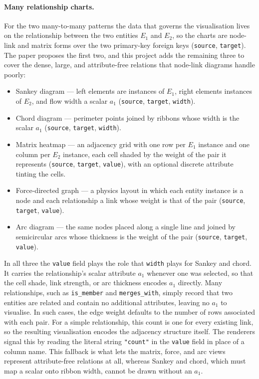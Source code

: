 \paragraph{Many relationship charts.} For the two many-to-many patterns the data that governs the visualisation lives on the relationship between the two entities $E_1$ and $E_2$, so the charts are node-link and matrix forms over the two primary-key foreign keys (\texttt{source}, \texttt{target}). The paper proposes the first two, and this project adds the remaining three to cover the dense, large, and attribute-free relations that node-link diagrams handle poorly:
\begin{itemize}
  \item Sankey diagram --- left elements are instances of $E_1$, right elements instances of $E_2$, and flow width a scalar $a_1$ (\texttt{source}, \texttt{target}, \texttt{width}).
  \item Chord diagram --- perimeter points joined by ribbons whose width is the scalar $a_1$ (\texttt{source}, \texttt{target}, \texttt{width}).
  \item Matrix heatmap --- an adjacency grid with one row per $E_1$ instance and one column per $E_2$ instance, each cell shaded by the weight of the pair it represents (\texttt{source}, \texttt{target}, \texttt{value}), with an optional discrete attribute tinting the cells.
  \item Force-directed graph --- a physics layout in which each entity instance is a node and each relationship a link whose weight is that of the pair (\texttt{source}, \texttt{target}, \texttt{value}).
  \item Arc diagram --- the same nodes placed along a single line and joined by semicircular arcs whose thickness is the weight of the pair (\texttt{source}, \texttt{target}, \texttt{value}).
\end{itemize}
In all three the \texttt{value} field plays the role that \texttt{width} plays for Sankey and chord. It carries the relationship's scalar attribute $a_1$ whenever one was selected, so that the cell shade, link strength, or arc thickness encodes $a_1$ directly. Many relationships, such as \texttt{is\_member} and \texttt{merges\_with}, simply record that two entities are related and contain no additional attributes, leaving no $a_1$ to visualise. In such cases, the edge weight defaults to the number of rows associated with each pair. For a simple relationship, this count is one for every existing link, so the resulting visualisation encodes the adjacency structure itself. The renderers signal this by reading the literal string \texttt{"count"} in the \texttt{value} field in place of a column name. This fallback is what lets the matrix, force, and arc views represent attribute-free relations at all, whereas Sankey and chord, which must map a scalar onto ribbon width, cannot be drawn without an $a_1$.

